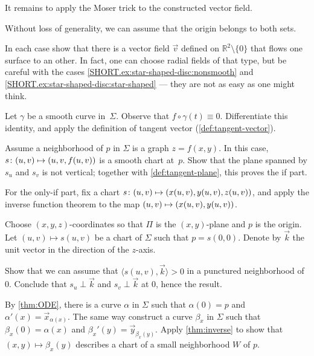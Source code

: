 \begin{multicols}{2}
It remains to apply the Moser trick to the constructed vector field. 

Without loss of generality, we can assume that the origin belongs to both sets.

In each case show that there is a vector field $\vec v$ defined on $\mathbb{R}^2\setminus\{0\}$ that flows one surface to an other.
In fact, one can choose radial fields of that type,
but be careful with the cases \ref{SHORT.ex:star-shaped-disc:nonsmooth} and \ref{SHORT.ex:star-shaped-disc:star-shaped} --- they are not as easy as one might think.


\setcounter{eqtn}{0}

Let $\gamma$ be a smooth curve in~$\Sigma$.
Observe that $f\circ\gamma(t)\equiv 0$.
Differentiate this identity, and apply the definition of tangent vector (\ref{def:tangent-vector}).

Assume a neighborhood of $p$ in $\Sigma$ is a graph $z=f(x,y)$.
In this case, $s\:(u,v)\z\mapsto (u,v,f(u,v))$ is a smooth chart at~$p$.
Show that the plane spanned by $s_u$ and $s_v$ is not vertical;
together with \ref{def:tangent-plane}, this proves the if part.

For the only-if part, fix a chart 
$s\:(u,v)\z\mapsto(x(u,v),y(u,v),z(u,v))$,
and apply the inverse function theorem to the map $(u,v)\z\mapsto(x(u,v),y(u,v))$.

Choose $(x,y,z)$-coordinates so that $\Pi$ is the $(x,y)$-plane and $p$ is the origin.
Let $(u,v)\mapsto s(u,v)$ be a chart of $\Sigma$ such that $p=s(0,0)$.
Denote by $\vec k$ the unit vector in the direction of the $z$-axis.

Show that we can assume that $\langle s(u,v),\vec k\rangle>0$ in a punctured neighborhood of $0$.
Conclude that $s_u\perp \vec k$ and $s_v\perp \vec k$ at
$0$, hence the result.

By \ref{thm:ODE}, there is a curve $\alpha$ in $\Sigma$ such that $\alpha(0)=p$ and $\alpha'(x)=\vec x_{\alpha(x)}$.
The same way construct a curve $\beta_x$ in $\Sigma$ such that $\beta_x(0)=\alpha(x)$ and $\beta_x'(y)=\vec y_{\beta_x(y)}$.
Apply \ref{thm:inverse} to show that $(x,y)\mapsto \beta_x(y)$ describes a chart of a small neighborhood $W$ of $p$.


\end{multicols}
